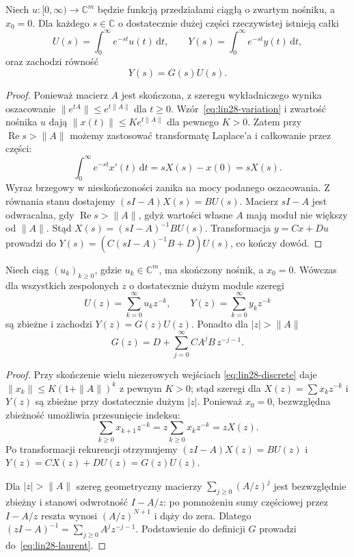 \begin{twierdzenie}
\label{thm:lin28-laplace}
Niech \(u\colon[0,\infty)\to\mathbb C^m\)
będzie funkcją przedziałami ciągłą o zwartym nośniku,
a \(x_0=0\). Dla każdego \(s\in\mathbb C\)
o dostatecznie dużej części rzeczywistej
istnieją całki
\[
 U(s)=\int_0^\infty e^{-st}u(t)\,\mathrm dt,
 \qquad
 Y(s)=\int_0^\infty e^{-st}y(t)\,\mathrm dt,
\]
oraz zachodzi równość
\[
 Y(s)=G(s)U(s).
 \tag{28.6}\label{eq:lin28-laplace}
\]
\end{twierdzenie}
\begin{proof}
Ponieważ macierz \(A\) jest skończona,
z szeregu wykładniczego wynika oszacowanie
\(\|e^{tA}\|\le e^{t\|A\|}\) dla \(t\ge0\).
Wzór~\eqref{eq:lin28-variation} i zwartość nośnika
\(u\) dają \(\|x(t)\|\le K e^{t\|A\|}\)
dla pewnego \(K>0\). Zatem przy
\(\operatorname{Re}s>\|A\|\) możemy zastosować
transformatę Laplace'a i całkowanie przez części:
\[
 \int_0^\infty e^{-st}x'(t)\,\mathrm dt
   =sX(s)-x(0)=sX(s).
\]
Wyraz brzegowy w nieskończoności zanika
na mocy podanego oszacowania.
Z równania stanu dostajemy
\((sI-A)X(s)=BU(s)\).
Macierz \(sI-A\) jest odwracalna,
gdy \(\operatorname{Re}s>\|A\|\), gdyż
wartości własne \(A\) mają moduł
nie większy od \(\|A\|\).
Stąd \(X(s)=(sI-A)^{-1}BU(s)\).
Transformacja \(y=Cx+Du\) prowadzi do
\(Y(s)=(C(sI-A)^{-1}B+D)U(s)\),
co kończy dowód.
\end{proof}

\begin{twierdzenie}
\label{thm:lin28-z}
Niech ciąg \((u_k)_{k\ge0}\), gdzie \(u_k\in\mathbb C^m\),
ma skończony nośnik, a \(x_0=0\). Wówczas dla wszystkich zespolonych
\(z\) o dostatecznie dużym module
szeregi
\[
 U(z)=\sum_{k=0}^\infty u_kz^{-k},
 \qquad
 Y(z)=\sum_{k=0}^\infty y_kz^{-k}
\]
są zbieżne i zachodzi \(Y(z)=G(z)U(z)\).
Ponadto dla \(|z|>\|A\|\)
\[
 G(z)=D+\sum_{j=0}^\infty CA^jB\,z^{-j-1}.
 \tag{28.7}\label{eq:lin28-laurent}
\]
\end{twierdzenie}
\begin{proof}
Przy skończenie wielu niezerowych wejściach
\eqref{eq:lin28-discrete} daje
\(\|x_k\|\le K(1+\|A\|)^k\) z pewnym \(K>0\);
stąd szeregi dla \(X(z)=\sum x_k z^{-k}\)
i \(Y(z)\) są zbieżne przy dostatecznie dużym \(|z|\).
Ponieważ \(x_0=0\), bezwzględna zbieżność
umożliwia przesunięcie indeksu:
\[
 \sum_{k\ge0}x_{k+1}z^{-k}
 =z\sum_{k\ge0}x_kz^{-k}=zX(z).
\]
Po transformacji rekurencji otrzymujemy
\((zI-A)X(z)=BU(z)\) i
\(Y(z)=CX(z)+DU(z)=G(z)U(z)\).

Dla \(|z|>\|A\|\) szereg geometryczny macierzy
\(\sum_{j\ge0}(A/z)^j\)
jest bezwzględnie zbieżny i stanowi odwrotność
\(I-A/z\): po pomnożeniu sumy częściowej
przez \(I-A/z\) reszta wynosi \((A/z)^{N+1}\)
i dąży do zera. Dlatego
\((zI-A)^{-1}=\sum_{j\ge0} A^j z^{-j-1}\).
Podstawienie do definicji \(G\)
prowadzi do~\eqref{eq:lin28-laurent}.
\end{proof}

